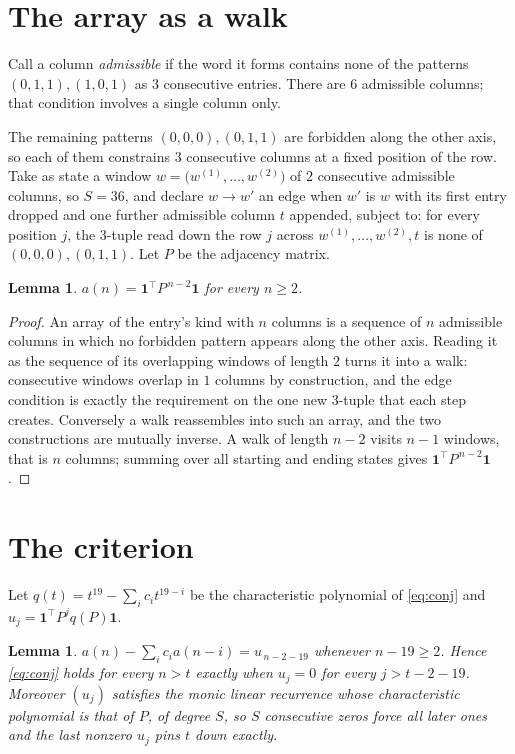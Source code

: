 \documentclass[11pt,a4paper]{article}
\theoremstyle{plain}
\newtheorem{lemma}[theorem]{Lemma}
\theoremstyle{definition}
\begin{document}
\section{The array as a walk}

Call a column \emph{admissible} if the word it forms contains none of the patterns
$(0,1,1), (1,0,1)$ as $3$ consecutive entries. There are $6$ admissible columns; that condition
involves a single column only.

The remaining patterns $(0,0,0), (0,1,1)$ are forbidden along the other axis, so each of them
constrains $3$ consecutive columns at a fixed position of the row. Take as state a
window $w=\bigl(w^{(1)},\dots,w^{(2)}\bigr)$ of $2$ consecutive admissible
columns, so $S=36$, and declare $w\to w'$ an edge when $w'$ is $w$ with its first entry
dropped and one further admissible column $t$ appended, subject to: for every position
$j$, the $3$-tuple read down the row $j$ across $w^{(1)},\dots,w^{(2)},t$
is none of $(0,0,0), (0,1,1)$. Let $P$ be the adjacency matrix.

\begin{lemma}\label{lem:walk}
$a(n)=\mathbf{1}^{\!\top}P^{\,n-2}\mathbf{1}$ for every $n\ge2$.
\end{lemma}

\begin{proof}
An array of the entry's kind with $n$ columns is a sequence of $n$ admissible columns in
which no forbidden pattern appears along the other axis. Reading it as the sequence of its
overlapping windows of length $2$ turns it into a walk: consecutive windows overlap in
$1$ columns by construction, and the edge condition is exactly the requirement on the one
new $3$-tuple that each step creates. Conversely a walk reassembles into such an array,
and the two constructions are mutually inverse. A walk of length $n-2$ visits $n-1$
windows, that is $n$ columns; summing over all starting and ending states gives
$\mathbf{1}^{\!\top}P^{\,n-2}\mathbf{1}$.
\end{proof}

\section{The criterion}

Let $q(t)=t^{19}-\sum_i c_i t^{19-i}$ be the characteristic polynomial of
\eqref{eq:conj} and $u_j=\mathbf{1}^{\!\top}P^{j}q(P)\mathbf{1}$.

\begin{lemma}\label{lem:crit}
$a(n)-\sum_i c_i a(n-i)=u_{\,n-2-19}$ whenever $n-19\ge2$. Hence
\eqref{eq:conj} holds for every $n>t$ exactly when $u_j=0$ for every
$j>t-2-19$. Moreover $(u_j)$ satisfies the monic linear recurrence whose
characteristic polynomial is that of $P$, of degree $S$, so $S$ consecutive zeros force all
later ones and the last nonzero $u_j$ pins $t$ down exactly.
\end{lemma}
\end{document}
